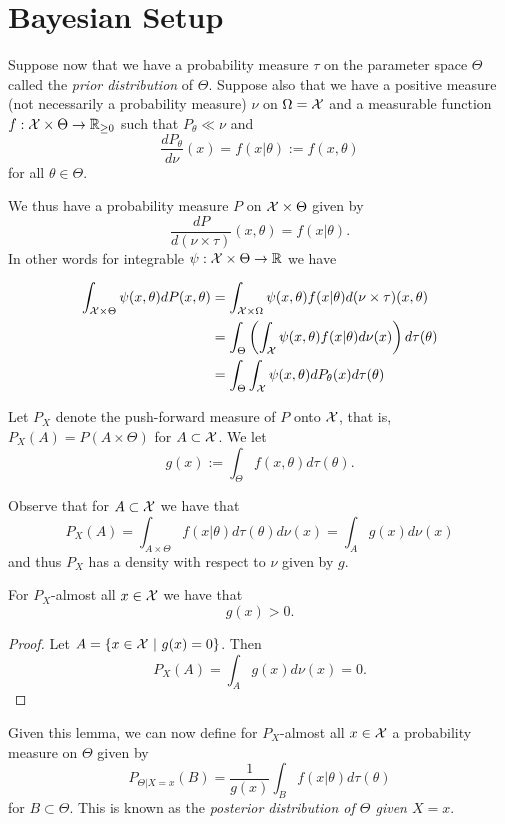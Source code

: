 \documentclass[twoside, a4paper, 10pt]{amsart}
\begin{document}
\section{Bayesian Setup}

Suppose now that we have a probability measure $\tau$ on the parameter space $\Theta$ called the \textit{prior distribution} of $\Theta$. Suppose also that we have a positive measure (not necessarily a probability measure) $\nu$ on $\Omega = \mathcal{X}$ and a measurable function $f:\mathcal{X} \times \Theta \to \mathbb{R}_{\geq 0}$ such that $P_{\theta} \ll \nu$ and $$\frac{dP_{\theta}}{d\nu} (x) = f(x|\theta) := f(x, \theta)$$ for all $\theta \in \Theta$.

We thus have a probability measure $P$ on $\mathcal{X} \times \Theta$ given by $$\frac{dP}{d(\nu \times \tau)}(x,\theta) = f(x|\theta).$$ In other words for integrable $\psi:\mathcal{X} \times \Theta \to \mathbb{R}$ we have 

\begin{align*} \int_{\mathcal{X} \times \Theta} \psi(x,\theta) dP(x,\theta) &= \int_{\mathcal{X} \times \Omega } \psi(x,\theta) f(x|\theta) d(\nu \times \tau) (x,\theta) \\ &= \int_{\Theta} \left( \int_{\mathcal{X}} \psi(x,\theta) f(x|\theta) d\nu(x) \right) d\tau(\theta) \\
&=  \int_{\Theta} \int_{\mathcal{X}} \psi(x,\theta) dP_{\theta}(x) d\tau(\theta)   \end{align*}



Let $P_X$ denote the push-forward measure of $P$ onto $\mathcal{X}$, that is, $P_X(A) = P(A \times \Theta)$ for $A \subset \mathcal{X}$. We let $$g(x) := \int_{\Theta} f(x,\theta) d\tau(\theta).$$

Observe that for $A \subset \mathcal{X}$ we have that $$P_X(A) = \int_{A \times \Theta} f(x|\theta) d\tau(\theta) d\nu(x) = \int_{A} g(x) d\nu(x)$$ and thus $P_X$ has a density with respect to $\nu$ given by $g$.
\begin{lemma} For $P_X$-almost all $x \in \mathcal{X} $ we have that $$g(x)  > 0.$$

\end{lemma}

\begin{proof} Let $A = \{x \in \mathcal{X} ~|~ g(x) = 0 \}$. Then $$P_X(A) = \int_{A} g(x) d\nu(x) = 0.  $$

\end{proof}

Given this lemma, we can now define for $P_X$-almost all $x \in \mathcal{X}$ a probability measure on $\Theta$ given by $$P_{\Theta|X=x}(B) = \frac{1}{g(x)} \int_{B} f(x|\theta) d\tau(\theta)$$ for $B \subset \Theta$. This is known as the \textit{posterior distribution of $\Theta$ given $X = x$}.
\end{document}
